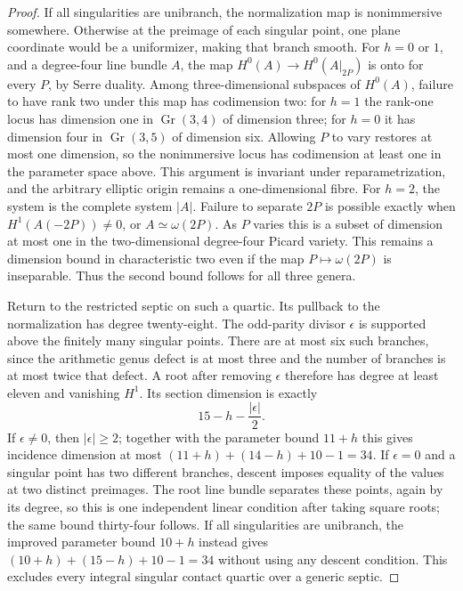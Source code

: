 \begin{proof}
If all singularities are unibranch, the normalization map is
nonimmersive somewhere.  Otherwise at the preimage of each singular
point, one plane coordinate would be a uniformizer, making that
branch smooth.  For $h=0$ or $1$, and a degree-four line bundle $A$,
the map
$H^0(A)\to H^0(A|_{2P})$ is onto for every $P$, by Serre duality.
Among three-dimensional subspaces of $H^0(A)$, failure to have rank
two under this map has codimension two: for $h=1$ the rank-one locus
has dimension one in $\operatorname{Gr}(3,4)$ of dimension three;
for $h=0$ it has dimension four in
$\operatorname{Gr}(3,5)$ of dimension six.
Allowing $P$ to vary restores at most one dimension, so the
nonimmersive locus has codimension at least one in the parameter
space above.  This argument is invariant under reparametrization,
and the arbitrary elliptic origin remains a one-dimensional fibre.
For $h=2$, the system is the complete system $|A|$.
Failure to separate $2P$ is possible exactly when
$H^1(A(-2P))\ne0$, or $A\simeq\omega(2P)$.
As $P$ varies this is a subset of dimension at most one in the
two-dimensional degree-four Picard variety.  This remains a
dimension bound in characteristic two even if the map
$P\mapsto\omega(2P)$ is inseparable.  Thus the second bound follows
for all three genera.

Return to the restricted septic on such a quartic.  Its pullback
to the normalization has degree twenty-eight.  The odd-parity
divisor $\epsilon$ is supported above the finitely many singular
points.  There are at most six such branches, since the arithmetic
genus defect is at most three and the number of branches is at
most twice that defect.  A root after removing $\epsilon$ therefore
has degree at least eleven and vanishing $H^1$.  Its section
dimension is exactly
\[
 15-h-\frac{|\epsilon|}{2}.
\]
If $\epsilon\ne0$, then $|\epsilon|\ge2$; together with the
parameter bound $11+h$ this gives incidence dimension at most
$(11+h)+(14-h)+10-1=34$.
If $\epsilon=0$ and a singular point has two different branches,
descent imposes equality of the values at two distinct preimages.
The root line bundle separates these points, again by its degree,
so this is one independent linear condition after taking square
roots; the same bound thirty-four follows.
If all singularities are unibranch, the improved parameter bound
$10+h$ instead gives
$(10+h)+(15-h)+10-1=34$ without using any descent condition.
This excludes every integral singular contact quartic over a
generic septic.


\end{proof}
